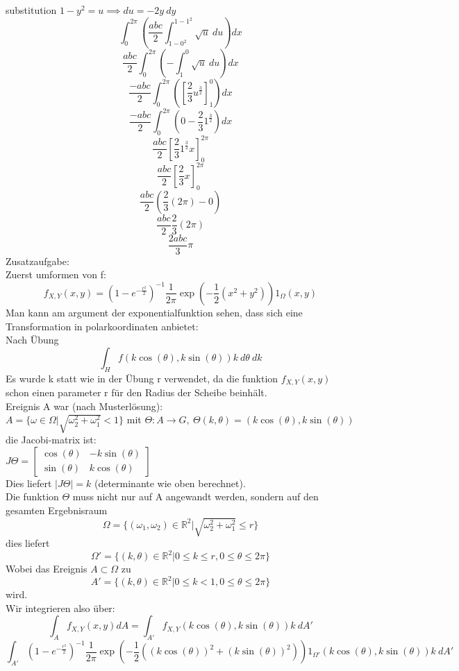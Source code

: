 \documentclass{article}
\begin{document}
	substitution $1-y^2 = u\implies du = -2y\ dy$\\
	$$\int_0^{2\pi}(\frac{abc}{2}\int_{1-0^2}^{1-1^2} \sqrt{u}\ du)dx$$
	$$\frac{abc}{2}\int_0^{2\pi}(-\int^{0}_{1} \sqrt{u}\ du)dx$$
	$$\frac{-abc}{2}\int_0^{2\pi}([\frac{2}{3}u^\frac{3}{2}]^0_1)dx$$
	$$\frac{-abc}{2}\int_0^{2\pi}(0-\frac{2}{3}1^\frac{3}{2})dx$$
	$$\frac{abc}{2}[\frac{2}{3}1^\frac{3}{2}x]^{2\pi}_0$$
	$$\frac{abc}{2}[\frac{2}{3}x]^{2\pi}_0$$
	$$\frac{abc}{2}(\frac{2}{3}(2\pi)-0)$$
	$$\frac{abc}{2}\frac{2}{3}(2\pi)$$
	$$\frac{2abc}{3}\pi$$
	Zusatzaufgabe:\\
	Zuerst umformen von f:\\
	$$f_{X,Y}(x,y) = (1-e^{-\frac{r^2}{2}})^{-1} \frac{1}{2\pi}\exp(-\frac{1}{2}(x^2+y^2))1_\Omega(x,y)$$
	Man kann am argument der exponentialfunktion sehen, dass sich eine Transformation in polarkoordinaten anbietet:\\
	Nach Übung 
	$$\int_H f(k\cos(\theta), k\sin(\theta))k\ d\theta\ dk$$
	Es wurde k statt wie in der Übung r verwendet, da die funktion $f_{X,Y}(x,y)$ schon einen parameter r für den Radius der Scheibe beinhält.\\
	Ereignis A war (nach Musterlösung):\\
	$A=\{\omega\in\Omega|\sqrt{\omega_2^2+\omega_1^2}<1\}$
	mit $\Theta: A\to G,\ \Theta(k,\theta)=(k\cos(\theta), k\sin(\theta))$\\
	die Jacobi-matrix ist:\\
	$J\Theta = \begin{bmatrix}\cos(\theta)&-k\sin(\theta)\\ \sin(\theta) &k\cos(\theta)\end{bmatrix}$\\
	Dies liefert $|J\Theta| = k$ (determinante wie oben berechnet).\\
	Die funktion $\Theta$ muss nicht nur auf A angewandt werden, sondern auf den gesamten Ergebnisraum
	$$\Omega =\{(\omega_1,\omega_2)\in\mathbb{R}^2|\sqrt{\omega_2^2+\omega_1^2}\leq r\}$$
	dies liefert
	$$\Omega' = \{(k,\theta)\in\mathbb{R}^2|0\leq k\leq r,0\leq\theta\leq 2\pi\}$$
	Wobei das Ereignis $A\subset \Omega$ zu\\
	$$A' = \{(k,\theta)\in\mathbb{R}^2|0\leq k< 1,0\leq\theta\leq 2\pi\}$$
	wird.\\
	Wir integrieren also über:
	$$\int_A  f_{X,Y}(x,y) dA = \int_{A'} f_{X,Y}(k\cos(\theta), k\sin(\theta))k\ dA'$$
	$$\int_{A'} (1-e^{-\frac{r^2}{2}})^{-1} \frac{1}{2\pi}\exp(-\frac{1}{2}((k\cos(\theta))^2+(k\sin(\theta))^2))1_{\Omega'}(k\cos(\theta),k\sin(\theta))k\ dA'$$
\end{document}
